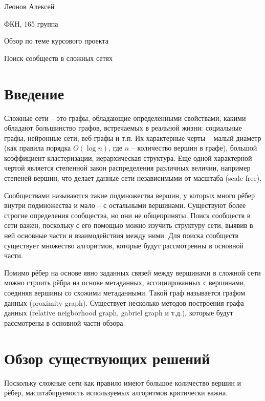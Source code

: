 \documentclass{article}
\begin{document}
	\begin{flushright}
	 \large{Леонов Алексей}
	 
	 \large{ФКН, 165 группа}
	\end{flushright}	    
    \begin{center}
    	\Large{Обзор по теме курсового проекта}
    	
    	\LARGE{Поиск сообществ в сложных сетях}
    \end{center}

\section*{Введение}

Сложные сети -- это графы, обладающие определёнными свойствами, какими обладают большинство графов, встречаемых в реальной жизни: социальные графы, нейронные сети, веб-графы и т.п.
Их характерные черты -- малый диаметр (как правила порядка $O(\log n)$, где $n$ -- количество вершин в графе), большой коэффициент кластеризации, иерархическая структура. Ещё одной характерной чертой является степенной закон распределения различных величин, например степеней вершин, что делает данные сети независимыми от масштаба (scale-free)\cite{comp_netw}.

Сообществами называются такие подмножества вершин, у которых много рёбер внутри подмножества и мало -- с остальными вершинами\cite{fortunado_small, fortunado_big}. Существуют более строгие определения сообщества, но они не общеприняты.
Поиск сообществ в сети важен, поскольку с его помощью можно изучить структуру сети, выявив в ней основные части и взаимодействия между ними.
Для поиска сообществ существует множество алгоритмов, которые будут рассмотренны в основной части.

Помимо рёбер на основе явно заданных связей между вершинами в сложной сети можно строить рёбра на основе метаданных, ассоциированных с вершинами, соединяя вершины со схожими метаданными. Такой граф называется графом данных (proximity graph). Существует несколько методов построения графа данных\cite{prox_gr} (relative neigborhood graph, gabriel graph и т.д.), которые будут рассмотрены в основной части обзора.

\section*{Обзор существующих решений}

Поскольку сложные сети как правило имеют большое количество вершин и рёбер, масштабируемость используемых алгоритмов критически важна.
\end{document}
